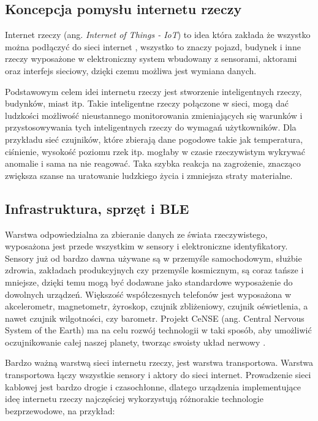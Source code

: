 \subsection{Koncepcja pomysłu internetu rzeczy}

Internet rzeczy (ang. \textit{Internet of Things - IoT}) to idea która zakłada że wszystko można podłączyć do sieci internet \cite{iot}, wszystko to znaczy pojazd, budynek i inne rzeczy wyposażone w elektroniczny system wbudowany z sensorami, aktorami oraz interfejs sieciowy, dzięki czemu możliwa jest wymiana danych. 

Podstawowym celem idei internetu rzeczy jest stworzenie inteligentnych rzeczy, budynków, miast itp. Takie inteligentne rzeczy połączone w sieci, mogą dać ludzkości możliwość nieustannego monitorowania zmieniających się warunków i przystosowywania tych inteligentnych rzeczy do wymagań użytkowników. Dla przykładu sieć czujników, które zbierają dane pogodowe takie jak temperatura, ciśnienie, wysokość poziomu rzek itp. mogłaby w czasie rzeczywistym wykrywać anomalie i sama na nie reagować. Taka szybka reakcja na zagrożenie, znacząco zwiększa szanse na uratowanie ludzkiego życia i zmniejsza straty materialne.

\subsection{Infrastruktura, sprzęt i BLE \cite{infrastrukturaiot}}

Warstwa odpowiedzialna za zbieranie danych ze świata rzeczywistego, wyposażona jest przede wszystkim w sensory i elektroniczne identyfikatory. Sensory już od bardzo dawna używane są w przemyśle samochodowym, służbie zdrowia, zakładach produkcyjnych czy przemyśle kosmicznym, są coraz tańsze i mniejsze, dzięki temu mogą być dodawane jako standardowe wyposażenie do dowolnych urządzeń. Większość współczesnych telefonów jest wyposażona w akcelerometr, magnetometr, żyroskop, czujnik zbliżeniowy, czujnik oświetlenia, a nawet czujnik wilgotności, czy barometr. Projekt CeNSE (ang. Central Nervous System of the Earth) ma na celu rozwój technologii w taki sposób, aby umożliwić oczujnikowanie całej naszej planety, tworząc swoisty układ nerwowy \cite{cense}.

Bardzo ważną warstwą sieci internetu rzeczy, jest warstwa transportowa. Warstwa transportowa łączy wszystkie sensory i aktory do sieci internet. Prowadzenie sieci kablowej jest bardzo drogie i czasochłonne, dlatego urządzenia implementujące ideę internetu rzeczy najczęściej wykorzystują różnorakie technologie bezprzewodowe, na przykład:

